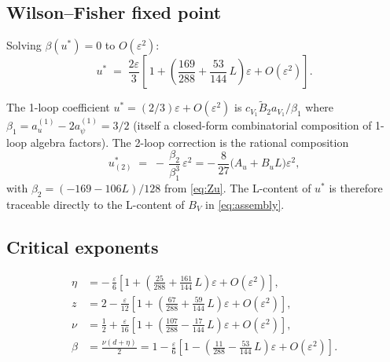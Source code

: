\documentclass[11pt,a4paper]{article}
\theoremstyle{definition}
\theoremstyle{plain}
\begin{document}
\subsection{Wilson--Fisher fixed point}

\begin{stdbox}
Solving $\beta(u^*) = 0$ to $O(\varepsilon^2)$:
\begin{equation}\label{eq:ustar}
  u^* \;=\; \frac{2\varepsilon}{3}\!\left[\,
    1 + \!\left(\frac{169}{288} + \frac{53}{144}\,L\right)\!\varepsilon
    + O(\varepsilon^2)\right].
  \tag{59}
\end{equation}
\end{stdbox}

\begin{cfacbox}
The 1-loop coefficient $u^* = (2/3)\varepsilon + O(\varepsilon^2)$ is
$c_{V_1}\tilde B_2 a_{V_1}/\beta_1$ where $\beta_1 = a_u^{(1)} -
2a_\psi^{(1)} = 3/2$ (itself a closed-form combinatorial composition
of 1-loop algebra factors).  The
2-loop correction is the rational composition
\begin{equation}
  u^*_{(2)} \;=\; -\,\frac{\beta_2}{\beta_1^3}\,\varepsilon^2
              = -\,\frac{8}{27}\bigl(A_u + B_u L\bigr)\varepsilon^2,
\end{equation}
with $\beta_2 = (-169 - 106 L)/128$ from \eqref{eq:Zu}.  The L-content
of $u^*$ is therefore traceable directly to the L-content of $B_V$ in
\eqref{eq:assembly}.
\end{cfacbox}

\subsection{Critical exponents}

\begin{stdbox}
\begin{align}
  \eta &= -\,\frac{\varepsilon}{6}\!\left[
    1 + \!\left(\frac{25}{288} + \frac{161}{144}\,L\right)\!\varepsilon
    + O(\varepsilon^2)\right], \tag{60a}\\
  z    &= 2 - \frac{\varepsilon}{12}\!\left[
    1 + \!\left(\frac{67}{288} + \frac{59}{144}\,L\right)\!\varepsilon
    + O(\varepsilon^2)\right], \tag{60b}\\
  \nu  &= \frac{1}{2} + \frac{\varepsilon}{16}\!\left[
    1 + \!\left(\frac{107}{288} - \frac{17}{144}\,L\right)\!\varepsilon
    + O(\varepsilon^2)\right], \tag{60c}\\
  \beta &= \frac{\nu(d+\eta)}{2}
        = 1 - \frac{\varepsilon}{6}\!\left[
    1 - \!\left(\frac{11}{288} - \frac{53}{144}\,L\right)\!\varepsilon
    + O(\varepsilon^2)\right]. \tag{60d}
\end{align}
\end{stdbox}
\end{document}
